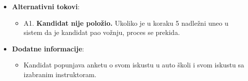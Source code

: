 \begin{itemize}
  \item \textbf{Alternativni tokovi}:
      \begin{itemize}
        \item A1. \textbf{Kandidat nije položio.}
        Ukoliko je u koraku 5 nadležni uneo u sistem da je kandidat pao vožnju, proces se prekida.
      \end{itemize}
      
  \item \textbf{Dodatne informacije}:
      \begin{itemize}
        \item Kandidat popunjava anketu o svom iskustu u auto školi i svom iskustu sa izabranim instruktoram.
      \end{itemize}
\end{itemize}
